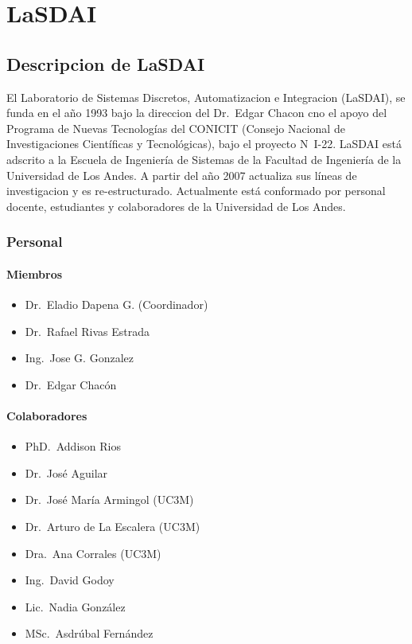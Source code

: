 \chapter{LaSDAI}

\section{Descripcion de LaSDAI} \label{App:DescripcionLasdai}

El Laboratorio de Sistemas Discretos, Automatizacion e Integracion (LaSDAI), se funda en el año 1993 bajo la direccion del Dr.\ Edgar Chacon cno el apoyo del Programa de Nuevas Tecnologías del CONICIT (Consejo Nacional de Investigaciones Científicas y Tecnológicas), bajo el proyecto N\textordmasculine\ I-22. LaSDAI está adscrito a la Escuela de Ingeniería de Sistemas de la Facultad de Ingeniería de la Universidad de Los Andes. A partir del año 2007 actualiza sus líneas de investigacion y es re-estructurado. Actualmente está conformado por personal docente, estudiantes y colaboradores de la Universidad de Los Andes.\cite{lasdaiInicio}

\subsection{Personal}

\subsubsection{Miembros}

\begin{itemize}
    \itemsep1pt \parskip0pt 
    \item Dr.\ Eladio Dapena G. (Coordinador)
    \item Dr.\ Rafael Rivas Estrada
    \item Ing.\ Jose G. Gonzalez
    \item Dr.\ Edgar Chacón
\end{itemize}

\subsubsection{Colaboradores}

\begin{itemize}
    \itemsep1pt \parskip0pt 
    \item PhD.\ Addison Rios
    \item Dr.\ José Aguilar
    \item Dr.\ José María Armingol (UC3M)
    \item Dr.\ Arturo de La Escalera (UC3M)
    \item Dra.\ Ana Corrales (UC3M)
    \item Ing.\ David Godoy
    \item Lic.\ Nadia González
    \item MSc.\ Asdrúbal Fernández
\end{itemize}

